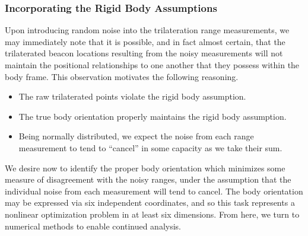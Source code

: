 \documentclass{report}
\begin{document}
				\subsubsection{Incorporating the Rigid Body Assumptions}
					Upon introducing random noise into the trilateration range measurements, we may immediately note that it is possible, and in fact almost certain, that the trilaterated beacon locations resulting from the noisy measurements will not maintain the positional relationships to one another that they possess within the body frame. This observation motivates the following reasoning.
					\begin{itemize}
						\item The raw trilaterated points violate the rigid body assumption.
						\item The true body orientation properly maintains the rigid body assumption.
						\item Being normally distributed, we expect the noise from each range measurement to tend to ``cancel'' in some capacity as we take their sum.
					\end{itemize}
					We desire now to identify the proper body orientation which minimizes some measure of disagreement with the noisy ranges, under the assumption that the individual noise from each measurement will tend to cancel. The body orientation may be expressed via six independent coordinates, and so this task represents a nonlinear optimization problem in at least six dimensions. From here, we turn to numerical methods to enable continued analysis.
\end{document}
